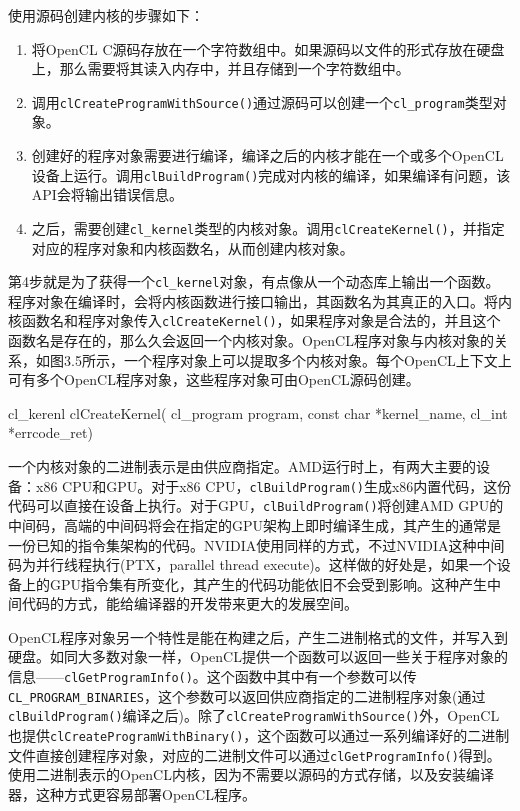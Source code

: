 使用源码创建内核的步骤如下：

\begin{enumerate}
\item 将OpenCL C源码存放在一个字符数组中。如果源码以文件的形式存放在硬盘上，那么需要将其读入内存中，并且存储到一个字符数组中。
\item 调用\texttt{clCreateProgramWithSource()}通过源码可以创建一个\texttt{cl\_program}类型对象。
\item 创建好的程序对象需要进行编译，编译之后的内核才能在一个或多个OpenCL设备上运行。调用\texttt{clBuildProgram()}完成对内核的编译，如果编译有问题，该API会将输出错误信息。
\item 之后，需要创建\texttt{cl\_kernel}类型的内核对象。调用\texttt{clCreateKernel()}，并指定对应的程序对象和内核函数名，从而创建内核对象。
\end{enumerate}

第4步就是为了获得一个\texttt{cl\_kernel}对象，有点像从一个动态库上输出一个函数。程序对象在编译时，会将内核函数进行接口输出，其函数名为其真正的入口。将内核函数名和程序对象传入\texttt{clCreateKernel()}，如果程序对象是合法的，并且这个函数名是存在的，那么久会返回一个内核对象。OpenCL程序对象与内核对象的关系，如图3.5所示，一个程序对象上可以提取多个内核对象。每个OpenCL上下文上可有多个OpenCL程序对象，这些程序对象可由OpenCL源码创建。

\begin{codebox}[cpp]
cl_kerenl
clCreateKernel(
  cl_program program,
  const char *kernel_name,
  cl_int *errcode_ret)
\end{codebox}

一个内核对象的二进制表示是由供应商指定。AMD运行时上，有两大主要的设备：x86 CPU和GPU。对于x86 CPU，\texttt{clBuildProgram()}生成x86内置代码，这份代码可以直接在设备上执行。对于GPU，\texttt{clBuildProgram()}将创建AMD GPU的中间码，高端的中间码将会在指定的GPU架构上即时编译生成，其产生的通常是一份已知的指令集架构的代码。NVIDIA使用同样的方式，不过NVIDIA这种中间码为并行线程执行(PTX，parallel thread execute)。这样做的好处是，如果一个设备上的GPU指令集有所变化，其产生的代码功能依旧不会受到影响。这种产生中间代码的方式，能给编译器的开发带来更大的发展空间。


OpenCL程序对象另一个特性是能在构建之后，产生二进制格式的文件，并写入到硬盘。如同大多数对象一样，OpenCL提供一个函数可以返回一些关于程序对象的信息——\texttt{clGetProgramInfo()}。这个函数中其中有一个参数可以传\texttt{CL\_PROGRAM\_BINARIES}，这个参数可以返回供应商指定的二进制程序对象(通过\texttt{clBuildProgram()}编译之后)。除了\texttt{clCreateProgramWithSource()}外，OpenCL也提供\texttt{clCreateProgramWithBinary()}，这个函数可以通过一系列编译好的二进制文件直接创建程序对象，对应的二进制文件可以通过\texttt{clGetProgramInfo()}得到。使用二进制表示的OpenCL内核，因为不需要以源码的方式存储，以及安装编译器，这种方式更容易部署OpenCL程序。


